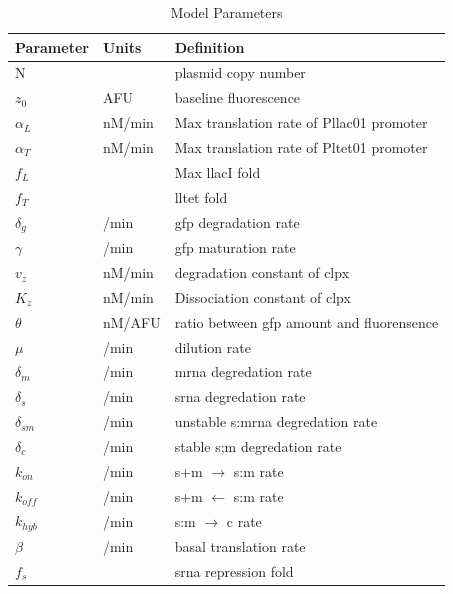 \documentclass[10pt,journal]{./IEEE_latex_class/IEEEtran}
\begin{document}
\begin{table}[h]
\renewcommand{\arraystretch}{1.3}
\caption{Model Parameters}
\label{ModelParameters}
\centering
\begin{tabular}{| l | l | l |}
\hline Parameter &  Units & Definition  \\
\hline \hline N & & plasmid copy number  \\
\hline $z_{0}$ &  AFU & baseline fluorescence  \\
\hline $\alpha_{L}$ & nM/min & Max translation rate of Pllac01 promoter  \\
\hline $\alpha_{T}$  &  nM/min  & Max translation rate of Pltet01 promoter \\
\hline $f_{L}$ &  & Max llacI fold  \\
\hline $f_{T}$ &  & lltet fold\\
\hline $\delta_{g}$  & /min  & gfp degradation rate  \\
\hline $\gamma$ &  /min & gfp maturation rate  \\
\hline $v_{z}$ & nM/min & degradation constant of clpx  \\
\hline $K_{z}$   &   nM/min & Dissociation constant of clpx  \\
\hline $\theta$  &   nM/AFU & ratio between gfp amount and fluorensence  \\
\hline $\mu$ &  /min & dilution rate  \\
\hline $\delta_{m}$ &  /min & mrna degredation rate  \\
\hline $\delta_{s}$ &  /min & srna degredation rate  \\
\hline $\delta_{sm}$ &  /min & unstable s:mrna degredation rate  \\
\hline $\delta_{c}$ &  /min & stable s;m degredation rate  \\
\hline $k_{on}$ &   /min & s+m $\rightarrow$ s:m rate \\
\hline $k_{off}$ &  /min & s+m $\leftarrow$ s:m rate \\
\hline $k_{hyb}$ &  /min & s:m $\rightarrow$ c rate \\
\hline $\beta$ &   /min & basal translation rate \\
\hline $f_{s}$ & & srna repression fold \\
\hline
\end{tabular}
\end{table}
\end{document}
